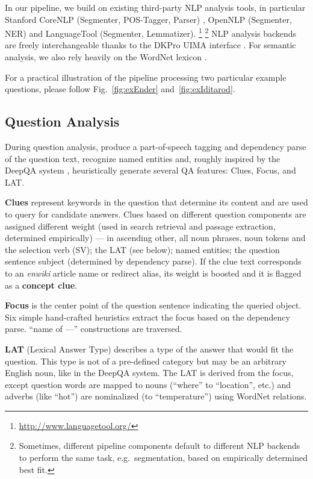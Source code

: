 In our pipeline, we build on existing third-party NLP analysis tools,
in particular Stanford CoreNLP (Segmenter, POS-Tagger, Parser) \citep{StanfordCoreNLP} \citep{StanfordNNParser},
OpenNLP (Segmenter, NER) \citep{OpenNLP} and LanguageTool (Segmenter, Lemmatizer).%
\footnote{\url{http://www.languagetool.org/}}%
\footnote{Sometimes, different pipeline components default to different
NLP backends to perform the same task, e.g.\ segmentation,
based on empirically determined best fit.}
NLP analysis backends are freely interchangeable thanks
to the DKPro UIMA interface \citep{DKPro}.
For semantic analysis, we also rely heavily on the WordNet lexicon \citep{WordNet}.

For a practical illustration of the pipeline processing two particular example questions,
please follow Fig.~\ref{fig:exEnder} and~\ref{fig:exIditarod}.


\subsection{Question Analysis}

During question analysis,
produce a part-of-speech tagging and dependency parse of the question text,
recognize named entities and,
roughly inspired by the DeepQA system \citep{WatsonQuestion},
heuristically generate several QA features: Clues, Focus, and LAT.

\textbf{Clues} represent keywords in the question that determine its content
and are used to query for candidate answers.
Clues based on different question components are assigned different weight
(used in search retrieval and passage extraction, determined empirically) ---
in ascending other, all noun phrases, noun tokens and the selection verb (SV);
the LAT (see below);
named entities;
the question sentence subject (determined by dependency parse).
If the clue text corresponds to an \textit{enwiki} article name or redirect alias,
its weight is boosted and it is flagged as a \textbf{concept clue}.

\textbf{Focus} is the center point of the question sentence
indicating the queried object.
Six simple hand-crafted heuristics extract the focus based on the dependency parse.
``name of ---'' constructions are traversed.

\textbf{LAT} (Lexical Answer Type) describes a type of the answer that would fit the question.
This type is not of a pre-defined category but may be an arbitrary English noun,
like in the DeepQA system. \citep{WatsonTyCor}
The LAT is derived from the focus, except question words are mapped to nouns
(``where'' to ``location'', etc.)
and adverbs (like ``hot'') are nominalized (to ``temperature'') using WordNet relations.

